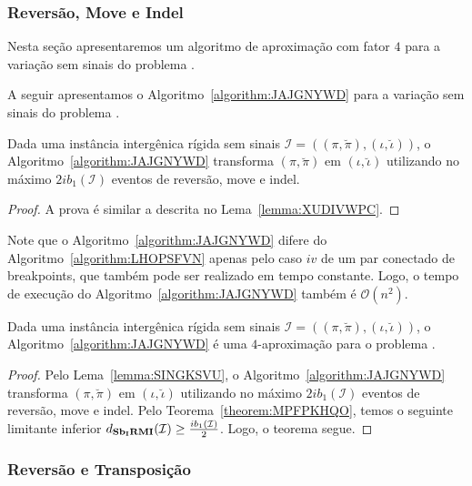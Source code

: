 \subsubsection{Reversão, Move e Indel}

Nesta seção apresentaremos um algoritmo de aproximação com fator $4$ para a variação sem sinais do problema \SbIRMI{}. 

A seguir apresentamos o Algoritmo~\ref{algorithm:JAJGNYWD} para a variação sem sinais do problema \SbIRMI{}.



\begin{lemma}\label{lemma:SINGKSVU}
Dada uma instância intergênica rígida sem sinais $\mathcal{I}=((\pi,\breve\pi),(\iota,\breve\iota))$, o Algoritmo~\ref{algorithm:JAJGNYWD} transforma $(\pi,\breve\pi)$ em $(\iota,\breve\iota)$ utilizando no máximo $2ib_1(\mathcal{I})$ eventos de reversão, move e indel.
\end{lemma}
\begin{proof}
  A prova é similar a descrita no Lema~\ref{lemma:XUDIVWPC}.
\end{proof}

Note que o Algoritmo~\ref{algorithm:JAJGNYWD} difere do Algoritmo~\ref{algorithm:LHOPSFVN} apenas pelo caso $iv$ de um par conectado de breakpoints, que também pode ser realizado em tempo constante. Logo, o tempo de execução do Algoritmo~\ref{algorithm:JAJGNYWD} também é $\mathcal{O}(n^2)$.

\begin{theorem}\label{theorem:WSCHLXXJ}
Dada uma instância intergênica rígida sem sinais $\mathcal{I}=((\pi,\breve\pi),(\iota,\breve\iota))$, o Algoritmo~\ref{algorithm:JAJGNYWD} é uma $4$-aproximação para o problema \SbIRMI{}.
\end{theorem}
\begin{proof}
Pelo Lema~\ref{lemma:SINGKSVU}, o Algoritmo~\ref{algorithm:JAJGNYWD} transforma $(\pi,\breve\pi)$ em $(\iota,\breve\iota)$ utilizando no máximo $2ib_1(\mathcal{I})$ eventos de reversão, move e indel. Pelo Teorema~\ref{theorem:MPFPKHQO}, temos o seguinte limitante inferior $d_{\textbf{Sb\textsubscript{I}RMI}}(\mathcal{I}) \ge \frac{ib_1(\mathcal{I})}{2}$. Logo, o teorema segue. 
\end{proof}

\subsubsection{Reversão e Transposição}


